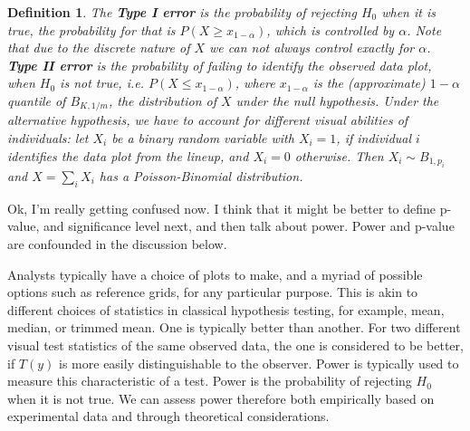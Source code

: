 \documentclass{article}
\newcommand{\red}[1]{{\color{red} #1}} %
\newcommand{\green}[1]{{\color{green} #1}} %
\newtheorem{dfn}{Definition}[section]
\begin{document}
\begin{dfn}\label{dfn:error}
The \textbf{Type I error} is the probability of \red{rejecting $H_0$ when it is true, the probability for that is $P(X \ge x_{1-\alpha})$, which is controlled by $\alpha$. Note that due to the discrete nature of $X$ we can not always control exactly for $\alpha$. }
\textbf{Type II error} is the probability of failing to identify the observed data plot, when $H_0$ is not true, \red{i.e. $P( X \le x_{1-\alpha})$, where $x_{1 - \alpha}$ is the (approximate) $1-\alpha$ quantile of  $B_{K, 1/m}$, the distribution of $X$ under the null hypothesis.}
\red{Under the alternative hypothesis, we have to account for different visual abilities of  individuals: let $X_i$ be a binary random variable with $X_i = 1$, if individual $i$ identifies the data plot from the lineup, and $X_i = 0$ otherwise.  Then $X_i \sim B_{1, p_i}$ and $X = \sum_i X_i$ has  a Poisson-Binomial distribution.}
\end{dfn}





\green{Ok, I'm really getting confused now. I think that it might be better to define p-value, and significance level next, and then talk about power. Power and p-value are confounded in the discussion below.}

\noindent 
Analysts typically have a choice of plots to make, and a myriad of possible options such as reference grids, for any particular purpose. This is akin to different choices of statistics in classical hypothesis testing, for example, mean, median, or trimmed mean. One is typically better than another. For two different visual test statistics of the same observed data, the one is considered to be better, if $T(y)$ is more easily distinguishable to the observer. Power is typically used to measure this characteristic of a test. Power is the probability of rejecting $H_0$ when it is not true.  We can assess power therefore both empirically based on experimental data and through theoretical considerations. 
\end{document}
